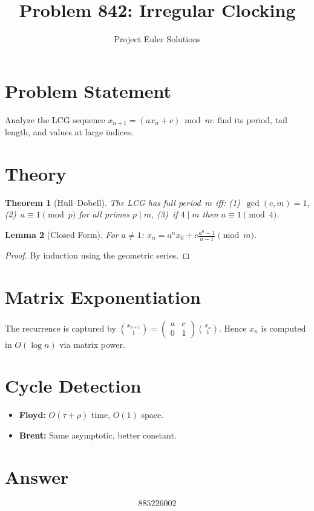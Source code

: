 \documentclass[11pt]{article}
\title{Problem 842: Irregular Clocking}
\author{Project Euler Solutions}
\date{}
\newtheorem{theorem}{Theorem}
\newtheorem{lemma}[theorem]{Lemma}
\begin{document}
\maketitle

\section{Problem Statement}
Analyze the LCG sequence $x_{n+1} = (ax_n + c) \bmod m$: find its period, tail length, and values at large indices.

\section{Theory}

\begin{theorem}[Hull--Dobell]
The LCG has full period~$m$ iff: (1)~$\gcd(c,m)=1$, (2)~$a \equiv 1 \pmod{p}$ for all primes $p \mid m$, (3)~if $4 \mid m$ then $a \equiv 1 \pmod{4}$.
\end{theorem}

\begin{lemma}[Closed Form]
For $a \ne 1$: $x_n = a^n x_0 + c\frac{a^n-1}{a-1} \pmod{m}$.
\end{lemma}

\begin{proof}
By induction using the geometric series.
\end{proof}

\section{Matrix Exponentiation}
The recurrence is captured by $\binom{x_{n+1}}{1} = \begin{pmatrix} a & c \\ 0 & 1\end{pmatrix}\binom{x_n}{1}$. Hence $x_n$ is computed in $O(\log n)$ via matrix power.

\section{Cycle Detection}
\begin{itemize}
\item \textbf{Floyd:} $O(\tau + \rho)$ time, $O(1)$ space.
\item \textbf{Brent:} Same asymptotic, better constant.
\end{itemize}

\section{Answer}

\[
\boxed{885226002}
\]
\end{document}
